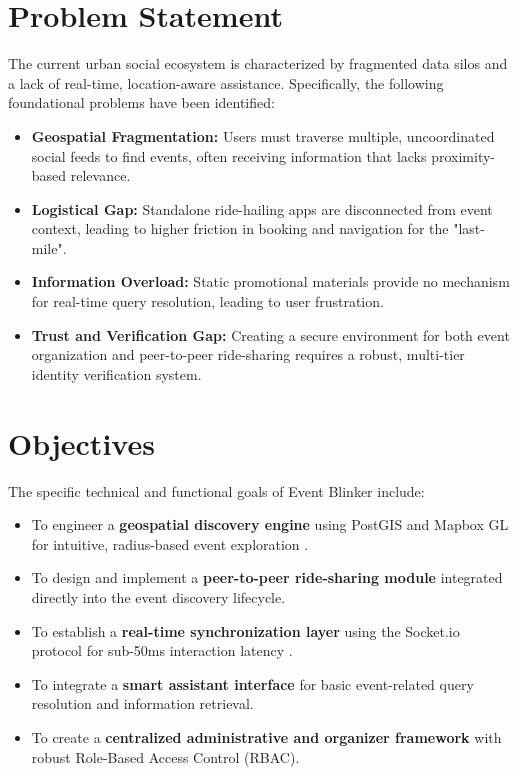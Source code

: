 \section{Problem Statement}
The current urban social ecosystem is characterized by fragmented data silos and a lack of real-time, location-aware assistance. Specifically, the following foundational problems have been identified:
\begin{itemize}
    \item \textbf{Geospatial Fragmentation:} Users must traverse multiple, uncoordinated social feeds to find events, often receiving information that lacks proximity-based relevance.
    \item \textbf{Logistical Gap:} Standalone ride-hailing apps are disconnected from event context, leading to higher friction in booking and navigation for the "last-mile".
    \item \textbf{Information Overload:} Static promotional materials provide no mechanism for real-time query resolution, leading to user frustration.
    \item \textbf{Trust and Verification Gap:} Creating a secure environment for both event organization and peer-to-peer ride-sharing requires a robust, multi-tier identity verification system.
\end{itemize}

\section{Objectives}
The specific technical and functional goals of Event Blinker include:
\begin{itemize}
    \item To engineer a \textbf{geospatial discovery engine} using PostGIS and Mapbox GL for intuitive, radius-based event exploration \cite{postgis}.
    \item To design and implement a \textbf{peer-to-peer ride-sharing module} integrated directly into the event discovery lifecycle.
    \item To establish a \textbf{real-time synchronization layer} using the Socket.io protocol for sub-50ms interaction latency \cite{socketio}.
    \item To integrate a \textbf{smart assistant interface} for basic event-related query resolution and information retrieval.
    \item To create a \textbf{centralized administrative and organizer framework} with robust Role-Based Access Control (RBAC).
\end{itemize}

